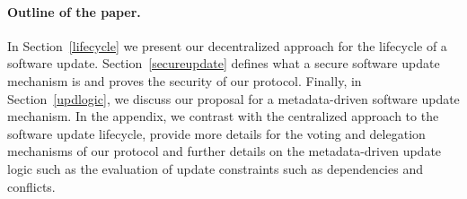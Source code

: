 \paragraph{Outline of the paper.} In Section~\ref{lifecycle} we present our decentralized approach for the lifecycle of a software update. Section~\ref{secureupdate} defines what a secure software update mechanism is and proves the security of our protocol. Finally, in Section~\ref{updlogic}, we discuss our proposal for a metadata-driven software update mechanism. In the appendix, we contrast with the centralized approach to the software update lifecycle, provide more details for the voting and delegation mechanisms of our protocol and further details on the metadata-driven update logic such as the evaluation of update constraints such as dependencies and conflicts.
